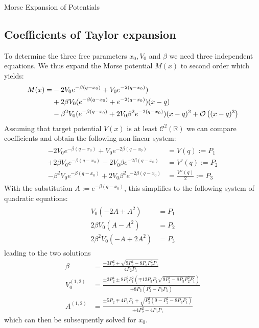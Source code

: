 \begin{chapter}{Morse Expansion of Potentials}
\subsection{Coefficients of Taylor expansion} %
\label{sub:Coefficients of Taylor expansion}
To determine the three free parameters $x_0, V_0$ and $\beta$ we need three independent equations. We thus expand the Morse potential $M(x)$ to second
order which yields:
\begin{align}
	\begin{split}
    M(x)=&-2V_0e^{-\beta(q-x_0)}+V_0e^{-2(q-x_0)})\\
    &+2\beta V_0(e^{-\beta(q-x_0)}+e^{-2(q-x_0)})(x-q)\\
    &-\beta^2V_0(e^{-\beta(q-x_0)}+2V_0\beta^2e^{-2(q-x_0)})(x-q)^2+\mathcal{O}\left( (x-q)^3 \right)
    \end{split}
\end{align}
Assuming that target potential $V(x)$ is at least $\mathcal{C}^2(\mathbb{R})$ we can compare coefficients and obtain the following non-linear
system:
\begin{align}
    \label{eq:TaylorParamsOrig}
    \begin{split}
    -2V_0e^{-\beta(q-x_0)}+V_0e^{-2\beta(q-x_0)}&=V(q):=P_1\\
    +2\beta V_0 e^{-\beta(q-x_0)}-2V_0\beta e^{-2\beta(q-x_0)}&=V'(q):=P_2\\
    -\beta^2V_0 e^{-\beta(q-x_0)}+2V_0\beta^2 e^{-2\beta(q-x_0)}&=\frac{V''(q)}{2}:=P_3
    \end{split}
\end{align}
With the substitution $A:=e^{-\beta(q-x_0)}$, this simplifies to the following system
of quadratic equations:
\begin{align}
    \begin{split}
	V_0(-2A+A^2)&=P_1\\
	2\beta V_0(A-A^2)&=P_2\\
	2\beta^2 V_0(-A+2A^2)&=P_3
    \end{split}
\end{align}
leading to the two solutions
\begin{align}
\beta&=\frac{-3P_2^2+\sqrt{9P_2^4-8P_3P_2^2P_1}}{4P_2P_1}\\
V_0^{(1,2)}&=\frac{\pm3P_2^4\pm8P_3^2P_1^2(\mp12P_3P_1\sqrt{9P_2^4-8P_3P_2^2P_1})}{\pm8P_3(P_2^2-P_3P_1)}\\
A^{(1,2)}&=\frac{\pm5P_2\mp4P_3P_1+\sqrt{P_2^2(9-P_2^2-8P_3P_1)}}{\pm4P_2^2-4P_3P_1}
\end{align}
which can then be subsequently solved for $x_0$.\\


\end{chapter}
